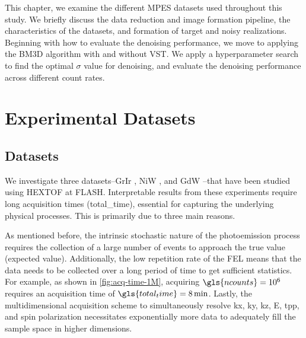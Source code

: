 This chapter, we examine the different \gls{MPES} datasets used throughout this study. We briefly discuss the data reduction and image formation pipeline, the characteristics of the datasets, and formation of target and noisy realizations. Beginning with how to evaluate the denoising performance, we move to applying the \gls{BM3D} algorithm with and without \gls{VST}. We apply a hyperparameter search to find the optimal $\sigma$ value for denoising, and evaluate the denoising performance across different count rates.

\section{Experimental Datasets}\label{section:datasets}
\subsection*{Datasets}
We investigate three datasets--\gls{GrIr} \cite{heberMultispectralTimeresolvedEnergy2022}, \gls{NiW} \cite{shokeenRealtimeObservationNonequilibrium2024}, and \gls{GdW} \cite{kutnyakhovMultidimensionalPhotoemissionSpectra2024}--that have been studied using \gls{HEXTOF} at \gls{FLASH}. Interpretable results from these experiments require long acquisition times (\gls{total_time}), essential for capturing the underlying physical processes. This is primarily due to three main reasons. 

As mentioned before, the intrinsic stochastic nature of the photoemission process requires the collection of a large number of events to approach the true value (expected value). Additionally, the low repetition rate of the \gls{FEL} means that the data  needs to be collected over a long period of time to get sufficient statistics. For example, as shown in \cref{fig:acq-time-1M}, acquiring $\gls{ncounts}=\num{e6}$ requires an acquisition time of $\gls{total_time}=\qty{8}{\min}$. Lastly, the multidimensional acquisition scheme to simultaneously resolve \gls{kx}, \gls{ky}, \gls{kz}, \gls{E}, \gls{tpp}, and spin polarization necessitates exponentially more data to adequately fill the sample space in higher dimensions.

